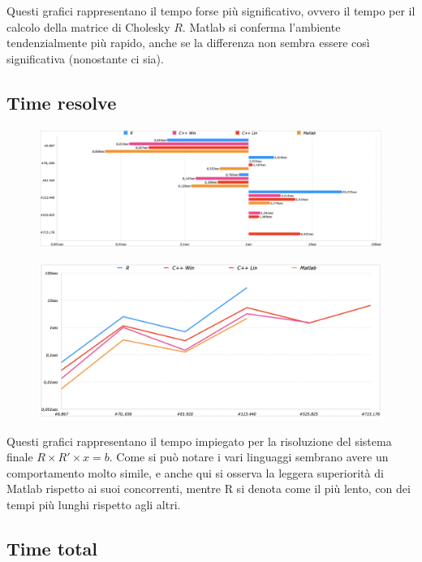 \documentclass[preprint,12pt]{elsarticle}
\begin{document}
Questi grafici rappresentano il tempo forse più significativo, ovvero il tempo per il calcolo della matrice di Cholesky $R$.
Matlab si conferma l'ambiente tendenzialmente più rapido, anche se la differenza non sembra essere così significativa (nonostante ci sia).

\subsection{Time resolve}

\begin{figure}[H]
	\centering
	\includegraphics[width=\linewidth]{solving1}
\end{figure}

\begin{figure}[H]
	\centering
	\includegraphics[width=\linewidth]{solving2}
\end{figure}

Questi grafici rappresentano il tempo impiegato per la risoluzione del sistema finale $R \times R' \times x = b$.
Come si può notare i vari linguaggi sembrano avere un comportamento molto simile, e anche qui si osserva la leggera superiorità di Matlab rispetto ai suoi concorrenti, mentre R si denota come il più lento, con dei tempi più lunghi rispetto agli altri.

\subsection{Time total}
\end{document}
